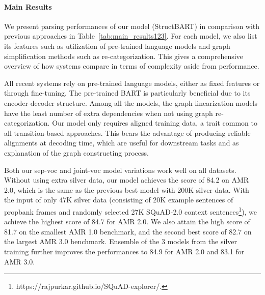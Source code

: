 \begin{table}[!t]
    \centering
     \caption{Average action sequence length and oracle coverage on AMR 2.0 training data from different transition systems.
    Average source sentence length is 18.9.
    }
    \label{tab:oracle_actions}
\end{table}

\paragraph{Main Results}

We present parsing performances of our model (StructBART) in comparison with previous approaches in Table~\ref{tab:main_results123}. For each model, we also list its features such as utilization of pre-trained language models and graph simplification methods such as re-categorization. This gives a comprehensive overview of how systems compare in terms of complexity aside from performance.

All recent systems rely on pre-trained language models, either as fixed features or through fine-tuning. 
The pre-trained BART is particularly beneficial due to its encoder-decoder structure. 
Among all the models, the graph linearization models \citep{xu2020improving, bevilacqua2021one} have the least number of extra dependencies when not using graph re-categorization. Our model only requires aligned training data, a trait common to all transition-based approaches. This bears the advantage of producing reliable alignments at decoding time, which are useful for downstream tasks and as explanation of the graph constructing process. 



Both our sep-voc and joint-voc model variations work well on all datasets.
Without using extra silver data, our model achieves the  score of 84.2 {\small } on AMR 2.0, which is the same as the previous best model \citep{bevilacqua2021one} with 200K silver data. With the input of only 47K silver data (consisting of 20K example sentences of propbank frames and randomly selected 27K SQuAD-2.0 context sentences\footnote{https://rajpurkar.github.io/SQuAD-explorer/.}), we achieve the highest score of 84.7 {\small } for AMR 2.0. We also attain the high score of 81.7 {\small } on the smallest AMR 1.0 benchmark, and the second best score of 82.7 {\small } on the largest AMR 3.0 benchmark. Ensemble of the 3 models from the silver training further improves the performances to 84.9 for AMR 2.0 and 83.1 for AMR 3.0.

